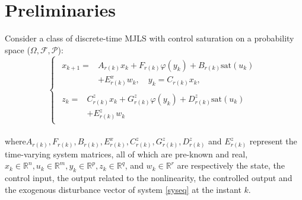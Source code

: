 \documentclass[conference]{IEEEtran}
\begin{document}




\section{Preliminaries}
Consider a class of discrete-time MJLS with control saturation on a probability space ($\varOmega,\mathcal{F},\mathcal{P}$):
\begin{equation}\label{syseq}
	\left\{
	\begin{array}{lr}
		\begin{split}
			x_{k+1}=&A_{r(k)}x_k+F_{r(k)}\varphi(y_k)+B_{r(k)}\mathrm{sat}(u_k) \\
			&+E^x_{r(k)}w_k, \quad y_k=C_{r(k)}x_k,
		\end{split}
		\\
		\begin{split}
			z_k=&C^z_{r(k)}x_k+G^z_{r(k)}\varphi(y_k)+D^z_{r(k)}\mathrm{sat}(u_k)\\
				&+E^z_{r(k)}w_k
		\end{split}
		
	\end{array}
	\right.
\end{equation}\\
where$A_{r(k)}, F_{r(k)}, B_{r(k)}, E^x_{r(k)}, C^z_{r(k)}, G^z_{r(k)}, D^z_{r(k)}$ and $E^z_{r(k)}$ represent the time-varying system matrices, all of which are pre-known and real, $x_k \in \mathbb{R}^{n}, u_k \in \mathbb{R}^{m}, y_k\in \mathbb{R}^{p}, z_k\in \mathbb{R}^{q}$, and $w_k\in\mathbb{R}^{r}$ are respectively the state, the control input, the output related to the nonlinearity, the controlled output and the exogenous disturbance vector of system \eqref{syseq} at the instant $k$.  
\end{document}

